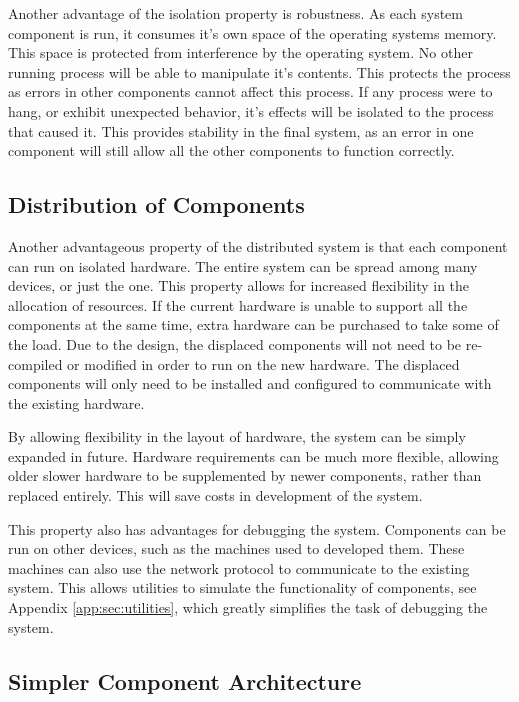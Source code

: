 Another advantage of the isolation property is robustness. As each system component is run, it consumes it's own space of the operating systems memory. This space is protected from interference by the operating system. No other running process will be able to manipulate it's contents. This protects the process as errors in other components cannot affect this process. If any process were to hang, or exhibit unexpected behavior, it's effects will be isolated to the process that caused it. This provides stability in the final system, as an error in one component will still allow all the other components to function correctly.

\subsection{Distribution of Components}

Another advantageous property of the distributed system is that each component can run on isolated hardware. The entire system can be spread among many devices, or just the one. This property allows for increased flexibility in the allocation of resources. If the current hardware is unable to support all the components at the same time, extra hardware can be purchased to take some of the load. Due to the design, the displaced components will not need to be re-compiled or modified in order to run on the new hardware. The displaced components will only need to be installed and configured to communicate with the existing hardware. 

By allowing flexibility in the layout of hardware, the system can be simply expanded in future. Hardware requirements can be much more flexible, allowing older slower hardware to be supplemented by newer components, rather than replaced entirely. This will save costs in development of the system.

This property also has advantages for debugging the system. Components can be run on other devices, such as the machines used to developed them. These machines can also use the network protocol to communicate to the existing system. This allows utilities to simulate the functionality of components, see Appendix \ref{app:sec:utilities}, which greatly simplifies the task of debugging the system.

\subsection{Simpler Component Architecture}

